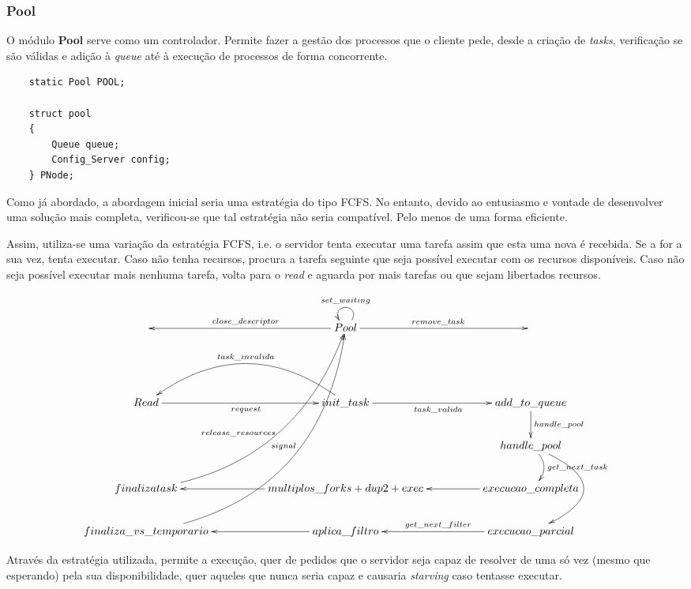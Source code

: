 \documentclass{article}
\begin{document}
\subsubsection{Pool} \label{pool}

O módulo \textbf{Pool} serve como um controlador. Permite fazer a gestão dos processos que o cliente pede, desde a
criação de \textit{tasks}, verificação se são válidas e adição à \textit{queue} até à execução de processos de forma concorrente.

\begin{verbatim}
    static Pool POOL;

    struct pool
    {
        Queue queue;
        Config_Server config;
    } PNode;
\end{verbatim}

Como já abordado, a abordagem inicial seria uma estratégia do tipo FCFS. No entanto, devido ao entusiasmo e vontade de desenvolver uma solução
mais completa, verificou-se que tal estratégia não seria compatível. Pelo menos de uma forma eficiente.

Assim, utiliza-se uma variação da estratégia FCFS, i.e. o servidor tenta executar uma tarefa assim que esta uma nova é recebida.
Se a for a sua vez, tenta executar.
Caso não tenha recursos, procura a tarefa seguinte que seja possível executar com os recursos disponíveis.
Caso não seja possível executar mais nenhuma tarefa,
volta para o \textit{read} e aguarda por mais tarefas ou que sejam libertados recursos.

\begin{equation*}
    \xymatrixcolsep{4pc}\xymatrix{
    & Pool\ar[l]_{close\_descriptor}\ar[r]^{remove\_task}\ar@(ur, ul)_{set\_waiting} & \\
    & & \\
    Read\ar[r]_{request} & init\_task\ar@/_3pc/[l]_{task\_invalida}\ar[r]_{task\_valida} & add\_to\_queue\ar[d]^{handle\_pool} \\
    & & handle\_pool\ar@/^1pc/[d]^{get\_next\_task}\ar@/^4pc/[dd] \\
    finaliza task\ar@/_3pc/[uuuur]_{signal}^{release\_resources} & multiplos\_forks+dup2+exec\ar[l] & execucao\_completa\ar[l] \\
    finaliza\_vs\_temporario\ar@/_4pc/[uuuuur] & aplica\_filtro\ar[l] & execucao\_parcial\ar[l]_{get\_next\_filter} \\
    }
\end{equation*}

Através da estratégia utilizada, permite a execução, quer de pedidos que o servidor seja capaz de resolver de uma só vez (mesmo que esperando)
pela sua disponibilidade, quer aqueles que nunca seria capaz e causaria \textit{starving} caso tentasse executar.
\end{document}
